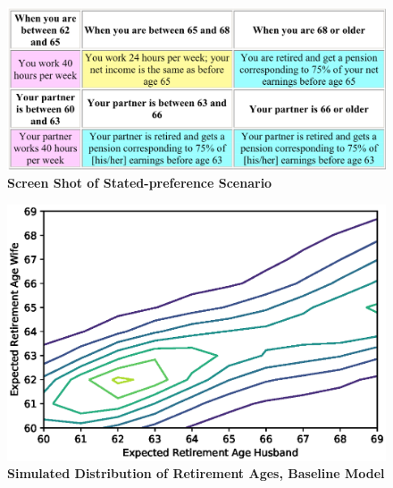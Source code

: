 \documentclass[11pt,letter]{article}
\begin{document}
\begin{figure}[!htbp]
\centering
\includegraphics[scale=0.3]{figures/screen.eps}
\caption{\textbf{Screen Shot of Stated-preference Scenario}}
\label{fig:screenshot}
\end{figure}

\begin{figure}[!htbp]
\centering
\includegraphics[scale=0.75]{figures/retages.eps}
\caption{\textbf{Simulated Distribution of Retirement Ages, Baseline Model}}
\label{fig:retages}
\end{figure}
\end{document}
